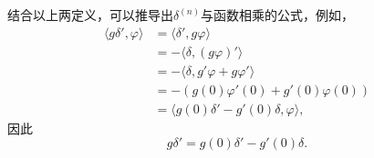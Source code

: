 \begin{example}
    结合以上两定义，可以推导出$\delta^{(n)}$与函数相乘的公式，例如，
    \begin{align}
        \langle g\delta',\varphi\rangle & =\langle \delta',g\varphi\rangle\nonumber\\
        & =-\langle\delta,(g\varphi)'\rangle\nonumber              \\
        & =-\langle\delta,g'\varphi+g\varphi'\rangle\nonumber      \\
        & =-(g(0)\varphi'(0)+g'(0)\varphi(0))\nonumber             \\
        & =\langle g(0)\delta'-g'(0)\delta,\varphi\rangle,
    \end{align}
    因此
    \begin{equation}
        g\delta'=g(0)\delta'-g'(0)\delta.
    \end{equation}
\end{example}

